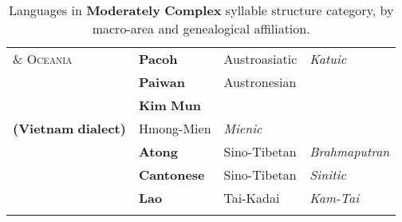 \begin{table}
\begin{tabularx}{\textwidth}{XXXX}
\textsc{\&} \textsc{Oceania} & \textbf{Pacoh} & Austroasiatic & \textit{Katuic}\\
\hhline{-~~~} & \textbf{Paiwan} & Austronesian & \\
& \textbf{Kim} \textbf{Mun} \\
\textbf{(Vietnam} \textbf{dialect)} & Hmong-Mien & \textit{Mienic}\\
& \textbf{Atong} & Sino-Tibetan & \textit{Brahmaputran}\\
& \textbf{Cantonese} & Sino-Tibetan & \textit{Sinitic}\\
& \textbf{Lao} & Tai-Kadai & \textit{Kam-Tai}\\
\hhline{~---}
\lspbottomrule
\end{tabularx}
\caption{\label{tab:key:2.5.} Languages in \textbf{Moderately} \textbf{Complex} syllable structure category, by macro-area and genealogical affiliation.}
\end{table}







